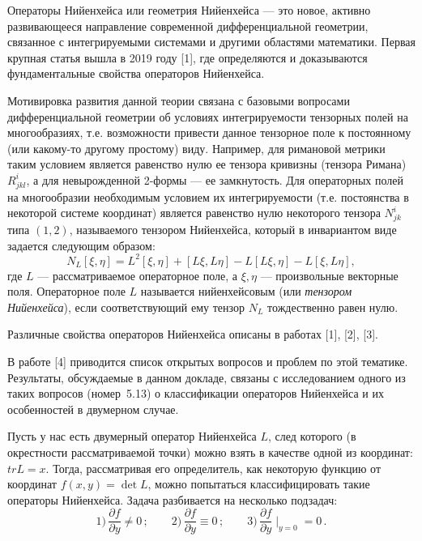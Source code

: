 
\vzmscaption

Операторы Нийенхейса или геометрия Нийенхейса --- это новое, активно развивающееся направление современной дифференциальной геометрии, связанное с интегрируемыми системами и другими областями математики.
Первая крупная статья вышла в 2019 году [1], где определяются и доказываются фундаментальные свойства операторов Нийенхейса.

Мотивировка развития данной теории связана с базовыми вопросами дифференциальной геометрии об условиях интегрируемости тензорных полей на многообразиях, т.е. возможности привести данное
тензорное поле к постоянному (или какому-то другому простому) виду. Например, для римановой метрики таким условием является равенство нулю ее тензора кривизны (тензора Римана) $R^i_{jkl}$,
а для невырожденной 2-формы --- ее замкнутость. Для операторных полей на многообразии необходимым условием их интегрируемости (т.е. постоянства в некоторой системе координат) является
равенство нулю некоторого тензора $N^i_{jk}$ типа $(1,2)$, называемого тензором Нийенхейса, который в инвариантом виде задается следующим образом:
\begin{equation*}
N_L [\xi, \eta] = L^2[\xi, \eta] + [L \xi, L \eta] - L[L \xi, \eta] - L[\xi, L \eta],
\end{equation*}
где $L$ --- рассматриваемое операторное поле, а $\xi,\eta$ --- произвольные векторные поля. Операторное поле $L$ называется нийенхейсовым (или \textit{тензором Нийенхейса}), если
соответствующий ему тензор $N_L$ тождественно равен нулю.

Различные свойства операторов Нийенхейса описаны в работах [1], [2], [3].

В работе [4] приводится список открытых вопросов и проблем по этой тематике. Результаты, обсуждаемые в данном докладе, связаны с исследованием одного из таких вопросов (номер~5.13)
о классификации операторов Нийенхейса и их особенностей в двумерном случае.

Пусть у нас есть двумерный оператор Нийенхейса $L$, след которого (в окрестности рассматриваемой точки) можно взять в качестве одной из координат: $tr L = x$.
Тогда, рассматривая его определитель, как некоторую функцию от координат $f(x,y)=\det L$, можно попытаться классифицировать такие операторы Нийенхейса.
Задача разбивается на несколько подзадач:
%
$$
1)\,\frac{\partial f}{\partial y} \neq 0    \,;\qquad
2)\,\frac{\partial f}{\partial y} \equiv 0  \,;\qquad
3)\,\frac{\partial f}{\partial y} \mid_{y = 0} = 0\,.
$$

